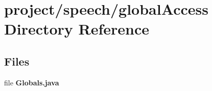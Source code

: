 \section{project/speech/global\+Access Directory Reference}
\label{dir_3423647a1c1acd3d3da3a2332f0d085a}
\subsection*{Files}
\begin{DoxyCompactItemize}
\item 
file {\bf Globals.\+java}
\end{DoxyCompactItemize}
